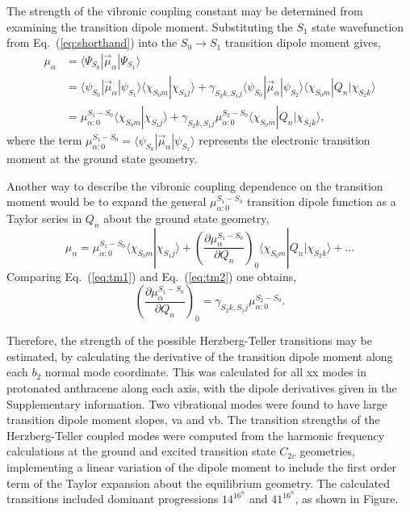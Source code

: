 \documentclass[journal=jpcafh,manuscript=article,layout=onecolumn, 12pt]{achemso}
\begin{document}
The strength of the vibronic coupling constant may be determined from examining the
transition dipole moment. Substituting the $S_1$ state wavefunction from Eq.~(\ref{eq:shorthand}) into the $S_0\rightarrow S_1$ transition dipole moment gives,
\begin{align}
\mu_{\alpha}&=\langle\Psi_{S_0}|\vec{\mu}_{\alpha}|\Psi_{S_1}\rangle\\
&=\langle\psi_{S_0}|\vec{\mu}_{\alpha}|\psi_{S_1}\rangle\langle\chi_{S_0m}|\chi_{S_1j}\rangle +
\gamma_{S_2k,S_1j}\langle\psi_{S_0}|\vec{\mu}_{\alpha}|\psi_{S_2}\rangle\langle\chi_{S_0m}|Q_n|\chi_{S_2k}\rangle\\
&=\mu_{\alpha:0}^{S_1-S_0}\langle\chi_{S_0m}|\chi_{S_1j}\rangle + \gamma_{S_2k,S_1j}\mu_{\alpha:0}^{S_2-S_0}\langle\chi_{S_0m}|Q_n|\chi_{S_2k}\rangle,
\end{align}
where the term $\mu_{\alpha:0}^{S_1-S_0}= \langle\psi_{S_0}|\vec{\mu}_{\alpha}|\psi_{S_1}\rangle$ represents the electronic transition moment at the ground state geometry.

Another way to describe the vibronic coupling dependence on the transition moment would be to expand the general $\mu_{\alpha:0}^{S_1-S_0}$ transition dipole function as a Taylor series in $Q_n$ about the ground state geometry,
\begin{equation}
\mu_{\alpha} = \mu_{\alpha:0}^{S_1-S_0}\langle\chi_{S_0m}|\chi_{S_1j}\rangle + \left(\frac{\partial\mu_{\alpha}^{S_1-S_0}}{\partial Q_n}\right)_0 \langle\chi_{S_0m}|Q_n|\chi_{S_2k}\rangle + \dots 
\label{eq:tm2}
\end{equation} 
Comparing Eq.~(\ref{eq:tm1}) and Eq.~(\ref{eq:tm2}) one obtains,
\begin{equation}
\left(\frac{\partial\mu_{\alpha}^{S_1-S_0}}{\partial Q_n}\right)_0 = \gamma_{S_2k,S_1j}\mu_{\alpha:0}^{S_2-S_0}.
\label{eq:tm3}
\end{equation}

Therefore, the strength of the possible Herzberg-Teller transitions may be estimated, by calculating the derivative of the transition dipole moment along each $b_2$ normal mode coordinate. This was calculated for all xx modes in protonated anthracene along each axis, with the dipole derivatives given in the Supplementary information. Two vibrational modes were found to have large transition dipole moment slopes, va and vb. The transition strengths of the Herzberg-Teller coupled modes were computed from the harmonic frequency calculations at the ground and excited transition state $C_{2v}$ geometries, implementing a linear variation of the dipole moment to include the first order term of the Taylor expansion about the equilibrium geometry. The calculated transitions included dominant progressions $14^16^n$ and $41^16^n$, as shown in Figure. 
\end{document}
